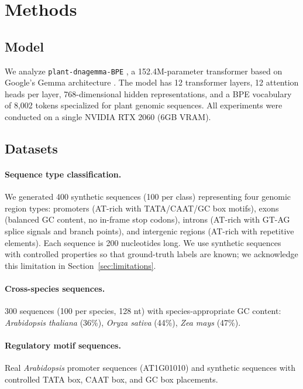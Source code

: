 \documentclass{article}
\begin{document}
\section{Methods}

\subsection{Model}

We analyze \texttt{plant-dnagemma-BPE} \citep{zhang2024plantdnagemma}, a 152.4M-parameter transformer based on Google's Gemma architecture \citep{team2024gemma}. The model has 12 transformer layers, 12 attention heads per layer, 768-dimensional hidden representations, and a BPE vocabulary of 8,002 tokens specialized for plant genomic sequences. All experiments were conducted on a single NVIDIA RTX 2060 (6GB VRAM).

\subsection{Datasets}

\paragraph{Sequence type classification.} We generated 400 synthetic sequences (100 per class) representing four genomic region types: promoters (AT-rich with TATA/CAAT/GC box motifs), exons (balanced GC content, no in-frame stop codons), introns (AT-rich with GT-AG splice signals and branch points), and intergenic regions (AT-rich with repetitive elements). Each sequence is 200 nucleotides long. We use synthetic sequences with controlled properties so that ground-truth labels are known; we acknowledge this limitation in Section~\ref{sec:limitations}.

\paragraph{Cross-species sequences.} 300 sequences (100 per species, 128 nt) with species-appropriate GC content: \textit{Arabidopsis thaliana} (36\%), \textit{Oryza sativa} (44\%), \textit{Zea mays} (47\%).

\paragraph{Regulatory motif sequences.} Real \textit{Arabidopsis} promoter sequences (AT1G01010) and synthetic sequences with controlled TATA box, CAAT box, and GC box placements.
\end{document}
